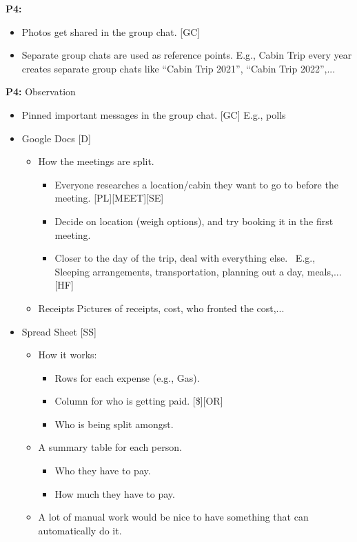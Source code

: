 \documentclass[12pt,a4paper]{article}
\begin{document}
\textbf{P4:}

\begin{itemize}
    \item Photos get shared in the group chat. [GC]
    \item Separate group chats are used as reference points.
E.g., Cabin Trip every year creates separate group chats like “Cabin Trip 2021”, “Cabin Trip 2022”,...

\end{itemize}

\textbf{P4:} Observation

\begin{itemize}
    \item Pinned important messages in the group chat. [GC] 
E.g., polls

    \item Google Docs [D]
    \begin{itemize}
        \item How the meetings are split.
        \begin{itemize}
            \item Everyone researches a location/cabin they want to go to before the meeting. [PL][MEET][SE] 
            \item Decide on location (weigh options), and try booking it in the first meeting. 
            \item Closer to the day of the trip, deal with everything else. 
E.g., Sleeping arrangements, transportation, planning out a day, meals,... [HF]

        \end{itemize}
        \item Receipts
Pictures of receipts, cost, who fronted the cost,...

    \end{itemize}
    \item Spread Sheet [SS]
    \begin{itemize}
        \item How it works: 
        \begin{itemize}
            \item Rows for each expense (e.g., Gas).
            \item Column for who is getting paid. [\$][OR]
            \item Who is being split amongst. 
        \end{itemize}
        \item A summary table for each person.
        \begin{itemize}
            \item Who they have to pay.
            \item How much they have to pay. 
        \end{itemize}
        \item A lot of manual work would be nice to have something that can automatically do it. 
    \end{itemize}
\end{itemize}
\end{document}
